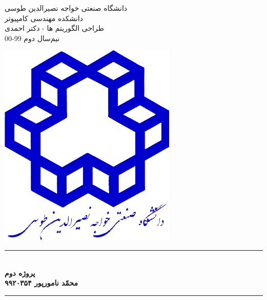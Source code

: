 \documentclass[12pt]{article}
\begin{document}
\newcommand{\HRule}{\rule{\linewidth}{0.5mm}} %
\newcommand\independent{\protect\mathpalette{\protect\independenT}{\perp}}
\def\independenT#1#2{\mathrel{\rlap{$#1#2$}\mkern2mu{#1#2}}}

\begin{minipage}[b]{0.65\linewidth}
\begin{center}
\textsc{\LARGE دانشگاه صنعتی خواجه نصیرالدین طوسی}\\[0.3cm]
\textsc{\Large دانشکده مهندسی کامپیوتر}\\[0.5cm]
\textsc{\large طراحی الگوریتم ها - دکتر احمدی}\\[0.5cm]
\textsc{\large نیم‌سال دوم 99-00}\\[0.5cm]
\end{center}
\end{minipage}
\hfill
\begin{minipage}[b]{0.35\linewidth}
\includegraphics[height=8\baselineskip]{kntu_logo.png}
\end{minipage}


\begin{center}
\HRule \\[0.4cm]
{ \Large \bfseries پروژه دوم}\\[0.4cm] %
{ \Large \bfseries  محمّد نامورپور ۹۹۲۰۳۵۴}\\[0.2cm] %
\HRule \\[0.4cm]
\end{center}
\end{document}
